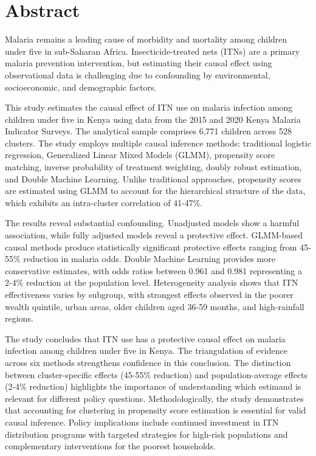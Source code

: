 \chapter*{Abstract}

Malaria remains a leading cause of morbidity and mortality among children under five in sub-Saharan Africa. Insecticide-treated nets (ITNs) are a primary malaria prevention intervention, but estimating their causal effect using observational data is challenging due to confounding by environmental, socioeconomic, and demographic factors.

This study estimates the causal effect of ITN use on malaria infection among children under five in Kenya using data from the 2015 and 2020 Kenya Malaria Indicator Surveys. The analytical sample comprises 6,771 children across 528 clusters. The study employs multiple causal inference methods: traditional logistic regression, Generalized Linear Mixed Models (GLMM), propensity score matching, inverse probability of treatment weighting, doubly robust estimation, and Double Machine Learning. Unlike traditional approaches, propensity scores are estimated using GLMM to account for the hierarchical structure of the data, which exhibits an intra-cluster correlation of 41-47\%.

The results reveal substantial confounding. Unadjusted models show a harmful association, while fully adjusted models reveal a protective effect. GLMM-based causal methods produce statistically significant protective effects ranging from 45-55\% reduction in malaria odds. Double Machine Learning provides more conservative estimates, with odds ratios between 0.961 and 0.981 representing a 2-4\% reduction at the population level. Heterogeneity analysis shows that ITN effectiveness varies by subgroup, with strongest effects observed in the poorer wealth quintile, urban areas, older children aged 36-59 months, and high-rainfall regions.

The study concludes that ITN use has a protective causal effect on malaria infection among children under five in Kenya. The triangulation of evidence across six methods strengthens confidence in this conclusion. The distinction between cluster-specific effects (45-55\% reduction) and population-average effects (2-4\% reduction) highlights the importance of understanding which estimand is relevant for different policy questions. Methodologically, the study demonstrates that accounting for clustering in propensity score estimation is essential for valid causal inference. Policy implications include continued investment in ITN distribution programs with targeted strategies for high-risk populations and complementary interventions for the poorest households.

